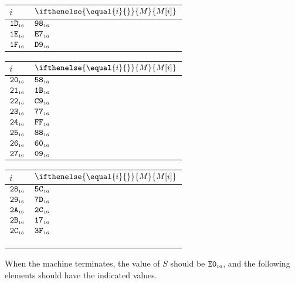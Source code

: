 \documentclass[a4paper,12pt]{article}
\makeatletter
\newcommand{\num}[1]{\texttt{#1}}
\newcommand{\hex}[1]{\num{#1}_{\textup{\tiny 16}}}
\newcommand{\MEM}[1]{\ifthenelse{\equal{#1}{}}{M}{M[#1]}}
\newcommand{\SP}{S}
\newenvironment{memtable}{%
  \begin{trivlist}
    \item
    }{%
    \end{trivlist}}
\newenvironment{memcolumn}{%
  \begin{tabular}{@{}ll@{}}
    $i$ & $\MEM{i}$ \\
    \hline}
    {%
    \hline
  \end{tabular}}
\newcommand{\memspace}{\qquad}
\makeatother
\begin{document}
\begin{memtable}
\begin{memcolumn}
    $\hex{1D}$ & $\hex{98}$ \\
    $\hex{1E}$ & $\hex{E7}$ \\
    $\hex{1F}$ & $\hex{D9}$ \\
  \end{memcolumn}
  \memspace
  \begin{memcolumn}
    $\hex{20}$ & $\hex{58}$ \\
    $\hex{21}$ & $\hex{1B}$ \\
    $\hex{22}$ & $\hex{C9}$ \\
    $\hex{23}$ & $\hex{77}$ \\
    $\hex{24}$ & $\hex{FF}$ \\
    $\hex{25}$ & $\hex{88}$ \\
    $\hex{26}$ & $\hex{60}$ \\
    $\hex{27}$ & $\hex{09}$ \\
  \end{memcolumn}
  \memspace
  \begin{memcolumn}
    $\hex{28}$ & $\hex{5C}$ \\
    $\hex{29}$ & $\hex{7D}$ \\
    $\hex{2A}$ & $\hex{2C}$ \\
    $\hex{2B}$ & $\hex{17}$ \\
    $\hex{2C}$ & $\hex{3F}$ \\
    \\
    \\
    \\
  \end{memcolumn}
\end{memtable}
When the machine terminates, the value of $\SP$ should be $\hex{E0}$, and the following elements should have the indicated values.
\end{document}
